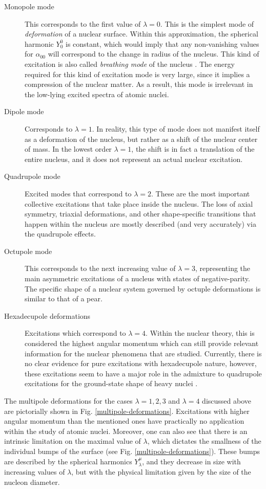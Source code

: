 \begin{description}
    \item[Monopole mode] This corresponds to the first value of $\lambda=0$. This is the simplest mode of \emph{deformation} of a nuclear surface. Within this approximation, the spherical harmonic $Y_0^0$ is constant, which would imply that any non-vanishing values for $\alpha_{00}$ will correspond to the change in radius of the nucleus. This kind of excitation is also called \emph{breathing mode} of the nucleus \cite{greiner1996nuclear,bohr1998nuclear}. The energy required for this kind of excitation mode is very large, since it implies a compression of the nuclear matter. As a result, this mode is irrelevant in the low-lying excited spectra of atomic nuclei.
    \item[Dipole mode] Corresponds to $\lambda=1$. In reality, this type of mode does not manifest itself as a deformation of the nucleus, but rather as a shift of the nuclear center of mass. In the lowest order $\lambda=1$, the shift is in fact a translation of the entire nucleus, and it does not represent an actual nuclear excitation.
    \item[Quadrupole mode] Excited modes that correspond to $\lambda=2$. These are the most important collective excitations that take place inside the nucleus. The loss of axial symmetry, triaxial deformations, and other shape-specific transitions that happen within the nucleus are mostly described (and very accurately) via the quadrupole effects.
    \item[Octupole mode] This corresponds to the next increasing value of $\lambda=3$, representing the main asymmetric excitations of a nucleus with states of negative-parity. The specific shape of a nuclear system governed by octuple deformations is similar to that of a pear.
    \item[Hexadecupole deformations] Excitations which correspond to $\lambda=4$. Within the nuclear theory, this is considered the highest angular momentum which can still provide relevant information for the nuclear phenomena that are studied. Currently, there is no clear evidence for pure excitations with hexadecupole nature, however, these excitations seem to have a major role in the admixture to quadrupole excitations for the ground-state shape of heavy nuclei \cite{greiner1996nuclear}.
\end{description}
The multipole deformations for the cases $\lambda=1,2,3$ and $\lambda=4$ discussed above are pictorially shown in Fig. \ref{multipole-deformations}.
Excitations with higher angular momentum than the mentioned ones have practically no application within the study of atomic nuclei. Moreover, one can also see that there is an intrinsic limitation on the maximal value of $\lambda$, which dictates the smallness of the individual bumps of the surface (see Fig. \ref{multipole-deformations}). These bumps are described by the spherical harmonics $Y_\lambda^\mu$, and they decrease in size with increasing values of $\lambda$, but with the physical limitation given by the size of the nucleon diameter.


